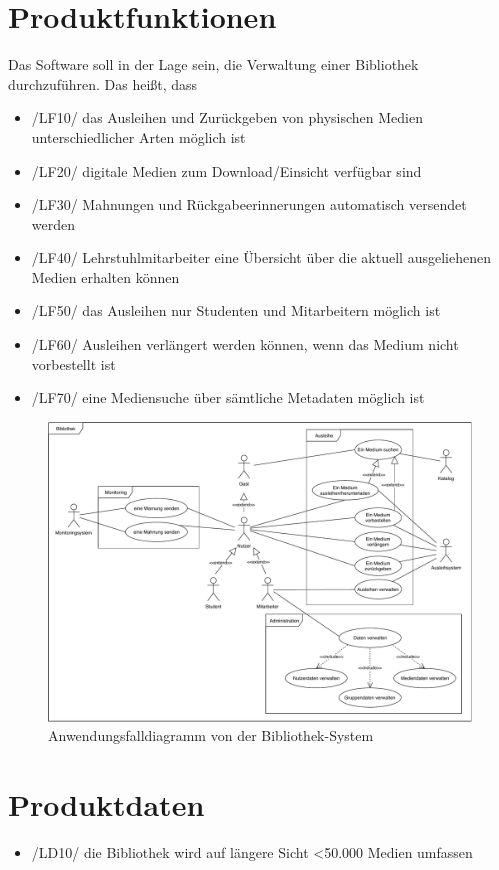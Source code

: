 \documentclass[12pt, a4paper]{article}
\begin{document}
\section{Produktfunktionen}
Das Software soll in der Lage sein, die Verwaltung einer Bibliothek durchzuführen. Das heißt, dass
\begin{itemize}
	\item /LF10/ das Ausleihen und Zurückgeben von physischen Medien unterschiedlicher Arten möglich ist
	\item /LF20/ digitale Medien zum Download/Einsicht verfügbar sind
	\item /LF30/ Mahnungen und Rückgabeerinnerungen automatisch versendet werden
	\item /LF40/ Lehrstuhlmitarbeiter eine Übersicht über die aktuell ausgeliehenen Medien erhalten können
	\item /LF50/ das Ausleihen nur Studenten und Mitarbeitern möglich ist
	\item /LF60/ Ausleihen verlängert werden können, wenn das Medium nicht vorbestellt ist
	\item /LF70/ eine Mediensuche über sämtliche Metadaten möglich ist
\end{itemize}

\begin{figure}[H]
	\includegraphics[width=1\linewidth]{diagrams/anwendungsfalldiagramm.pdf}
	\caption{Anwendungsfalldiagramm von der Bibliothek-System}
	\label{fig:anwendungsfalldiagramm}
\end{figure}

\section{Produktdaten}
\begin{itemize}
	\item /LD10/ die Bibliothek wird auf längere Sicht <50.000 Medien umfassen
\end{itemize}
\end{document}
